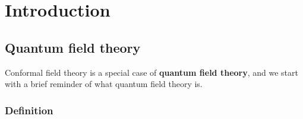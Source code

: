 \documentclass[12pt, a4paper, notitlepage, twoside]{report}
\numberwithin{equation}{section}
\theoremstyle{break}
\begin{document}
\chapter{Introduction \label{secintr}}

\section{Quantum field theory \label{secqft} }

Conformal field theory is a special case of \textbf{\boldmath quantum field theory}, and we start with a brief reminder of what quantum field theory is.

\subsection{Definition} 
\end{document}
